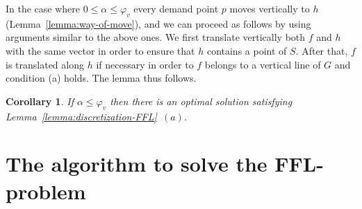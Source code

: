 \documentclass[11pt,a4paper,oneside,onecolumn]{article}
\newtheorem{corollary}[theorem]{Corollary}
\def\QED{\ensuremath{{\square}}}
\def\markatright#1{\leavevmode\unskip\nobreak\quad\hspace*{\fill}{#1}}
\newenvironment{proof}
{\begin{trivlist}\item[\hskip\labelsep{\bf Proof.}]}
{\markatright{\QED}\end{trivlist}}
\begin{document}
\begin{proof}
In the case where $0\leq\alpha\leq\varphi_v$ every demand point $p$
moves vertically to $h$ (Lemma~\ref{lemma:way-of-move}), and we can
proceed as follows by using arguments similar to the above ones. We
first translate vertically both $f$ and $h$ with the same vector in
order to ensure that $h$ contains a point of $S$. After that, $f$ is
translated along $h$ if necessary in order to $f$ belongs to a
vertical line of $G$ and condition (a) holds. The lemma thus
follows.
\end{proof}
\begin{corollary}\label{cor:discretization-FFL}
If $\alpha\leq\varphi_v$ then there is an optimal solution
satisfying Lemma~\ref{lemma:discretization-FFL}~$(a)$.
\end{corollary}



\section{The algorithm to solve the
FFL-problem}\label{section:algorithm-free}
\end{document}
